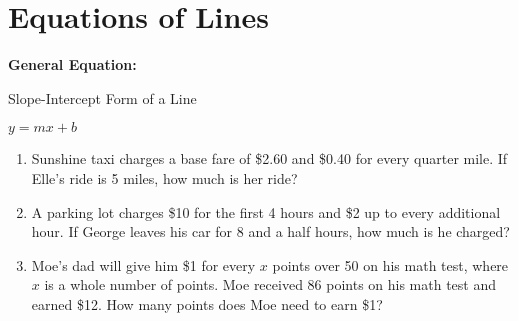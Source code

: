\section{Equations of Lines}

\bigskip
\textbf{General Equation:}

\begin{center}
Slope-Intercept Form of a Line

$y=mx+b$
\end{center}

\vfill
\begin{enumerate}[labelindent=*,style=multiline,leftmargin=*,label=\textbf{Example \arabic*:}]
\item Sunshine taxi charges a base fare of \$2.60 and \$0.40 for every quarter mile. If Elle's ride is 5 miles, how much is her ride?

\vfill\item A parking lot charges \$10 for the first 4 hours and \$2 up to every additional hour. If George leaves his car for 8 and a half hours, how much is he charged?

\vfill\item Moe's dad will give him \$1 for every $x$ points over 50 on his math test, where $x$ is a whole number of points. Moe received 86 points on his math test and earned \$12. How many points does Moe need to earn \$1?
\end{enumerate}

